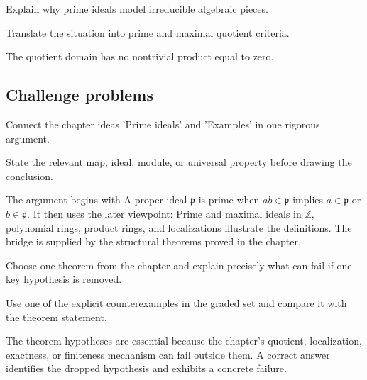 \begin{exercise}\label{exr:v02-expand-14}
Explain why prime ideals model irreducible algebraic pieces.
\end{exercise}
\begin{hint}
Translate the situation into prime and maximal quotient criteria.
\end{hint}
\begin{solution}
The quotient domain has no nontrivial product equal to zero.
\end{solution}

\subsection*{Challenge problems}

\begin{exercise}\label{exr:v02-expand-15}
Connect the chapter ideas 'Prime ideals' and 'Examples' in one rigorous argument.
\end{exercise}
\begin{hint}
State the relevant map, ideal, module, or universal property before drawing the conclusion.
\end{hint}
\begin{solution}
The argument begins with A proper ideal $\mathfrak p$ is prime when $ab\in\mathfrak p$ implies $a\in\mathfrak p$ or $b\in\mathfrak p$. It then uses the later viewpoint: Prime and maximal ideals in $\mathbb Z$, polynomial rings, product rings, and localizations illustrate the definitions. The bridge is supplied by the structural theorems proved in the chapter.
\end{solution}

\begin{exercise}\label{exr:v02-expand-16}
Choose one theorem from the chapter and explain precisely what can fail if one key hypothesis is removed.
\end{exercise}
\begin{hint}
Use one of the explicit counterexamples in the graded set and compare it with the theorem statement.
\end{hint}
\begin{solution}
The theorem hypotheses are essential because the chapter's quotient, localization, exactness, or finiteness mechanism can fail outside them. A correct answer identifies the dropped hypothesis and exhibits a concrete failure.
\end{solution}


